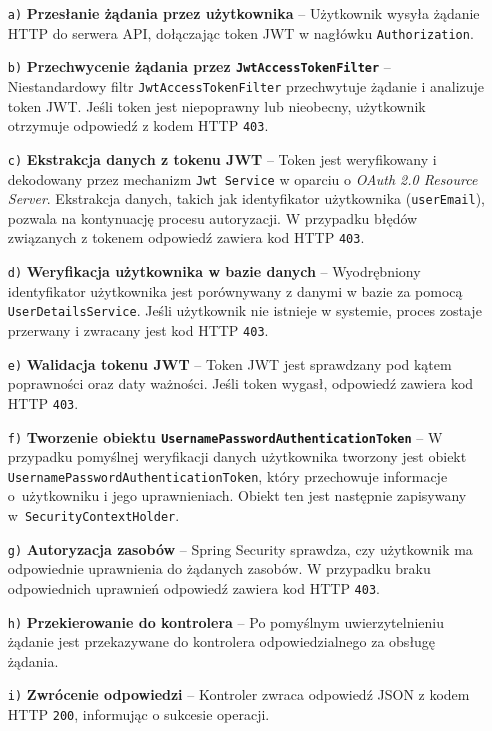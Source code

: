 \begin{enumerate}
    \item[\texttt{a)}] \textbf{Przesłanie żądania przez użytkownika} -- Użytkownik wysyła żądanie HTTP do serwera API, dołączając token JWT w nagłówku \texttt{Authorization}.
    
    \item[\texttt{b)}] \textbf{Przechwycenie żądania przez \texttt{JwtAccessTokenFilter}} -- Niestandardowy filtr \texttt{JwtAccessTokenFilter} przechwytuje żądanie i analizuje token JWT. Jeśli token jest niepoprawny lub nieobecny, użytkownik otrzymuje odpowiedź z kodem HTTP \texttt{403}.
    
    \item[\texttt{c)}] \textbf{Ekstrakcja danych z tokenu JWT} -- Token jest weryfikowany i dekodowany przez mechanizm \texttt{Jwt Service} w oparciu o \emph{OAuth 2.0 Resource Server}. Ekstrakcja danych, takich jak identyfikator użytkownika (\texttt{userEmail}), pozwala na kontynuację procesu autoryzacji. W przypadku błędów związanych z tokenem odpowiedź zawiera kod HTTP \texttt{403}.
    
    \item[\texttt{d)}] \textbf{Weryfikacja użytkownika w bazie danych} -- Wyodrębniony identyfikator użytkownika jest porównywany z danymi w bazie za pomocą \texttt{UserDetailsService}. Jeśli użytkownik nie istnieje w systemie, proces zostaje przerwany i zwracany jest kod HTTP \texttt{403}.
    
    \item[\texttt{e)}] \textbf{Walidacja tokenu JWT} -- Token JWT jest sprawdzany pod kątem poprawności oraz daty ważności. Jeśli token wygasł, odpowiedź zawiera kod HTTP \texttt{403}.
    
    \item[\texttt{f)}] \textbf{Tworzenie obiektu \texttt{UsernamePasswordAuthenticationToken}} -- W przypadku pomyślnej weryfikacji danych użytkownika tworzony jest obiekt \texttt{UsernamePasswordAuthenticationToken}, który przechowuje informacje o~użytkowniku i jego uprawnieniach. Obiekt ten jest następnie zapisywany w~\texttt{SecurityContextHolder}.
    
    \item[\texttt{g)}] \textbf{Autoryzacja zasobów} -- Spring Security sprawdza, czy użytkownik ma odpowiednie uprawnienia do żądanych zasobów. W przypadku braku odpowiednich uprawnień odpowiedź zawiera kod HTTP \texttt{403}.
    
    \item[\texttt{h)}] \textbf{Przekierowanie do kontrolera} -- Po pomyślnym uwierzytelnieniu żądanie jest przekazywane do kontrolera odpowiedzialnego za obsługę żądania.
    
    \item[\texttt{i)}] \textbf{Zwrócenie odpowiedzi} -- Kontroler zwraca odpowiedź JSON z kodem HTTP \texttt{200}, informując o sukcesie operacji.
\end{enumerate}

